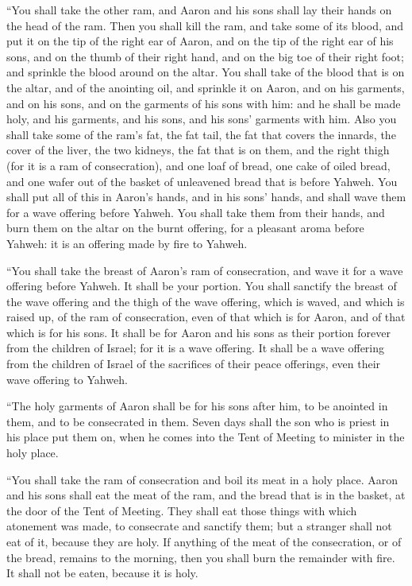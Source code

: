  ``You shall take the other ram, and Aaron and his sons
shall lay their hands on the head of the ram.  Then you
shall kill the ram, and take some of its blood, and put it on the tip of
the right ear of Aaron, and on the tip of the right ear of his sons, and
on the thumb of their right hand, and on the big toe of their right
foot; and sprinkle the blood around on the altar.  You
shall take of the blood that is on the altar, and of the anointing oil,
and sprinkle it on Aaron, and on his garments, and on his sons, and on
the garments of his sons with him: and he shall be made holy, and his
garments, and his sons, and his sons' garments with him. 
Also you shall take some of the ram's fat, the fat tail, the fat that
covers the innards, the cover of the liver, the two kidneys, the fat
that is on them, and the right thigh (for it is a ram of consecration),
 and one loaf of bread, one cake of oiled bread, and one
wafer out of the basket of unleavened bread that is before Yahweh.
 You shall put all of this in Aaron's hands, and in his
sons' hands, and shall wave them for a wave offering before Yahweh.
 You shall take them from their hands, and burn them on the
altar on the burnt offering, for a pleasant aroma before Yahweh: it is
an offering made by fire to Yahweh.

 ``You shall take the breast of Aaron's ram of
consecration, and wave it for a wave offering before Yahweh. It shall be
your portion.  You shall sanctify the breast of the wave
offering and the thigh of the wave offering, which is waved, and which
is raised up, of the ram of consecration, even of that which is for
Aaron, and of that which is for his sons.  It shall be for
Aaron and his sons as their portion forever from the children of Israel;
for it is a wave offering. It shall be a wave offering from the children
of Israel of the sacrifices of their peace offerings, even their wave
offering to Yahweh.

 ``The holy garments of Aaron shall be for his sons after
him, to be anointed in them, and to be consecrated in them.
 Seven days shall the son who is priest in his place put
them on, when he comes into the Tent of Meeting to minister in the holy
place.

 ``You shall take the ram of consecration and boil its meat
in a holy place.  Aaron and his sons shall eat the meat of
the ram, and the bread that is in the basket, at the door of the Tent of
Meeting.  They shall eat those things with which atonement
was made, to consecrate and sanctify them; but a stranger shall not eat
of it, because they are holy.  If anything of the meat of
the consecration, or of the bread, remains to the morning, then you
shall burn the remainder with fire. It shall not be eaten, because it is
holy.

